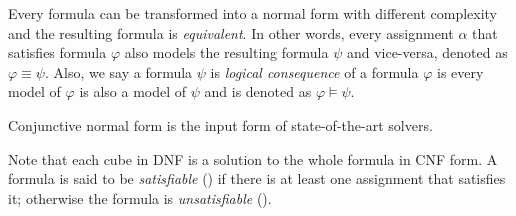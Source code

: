 Every formula can be transformed into a normal form with different complexity and the resulting formula is 
\emph{equivalent}.  
In other words, every assignment $\alpha$ that satisfies formula $\varphi$  also models the resulting formula $\psi$
and vice-versa, denoted as $\varphi \equiv \psi$.
 Also, we say a formula $\psi$ is \emph{logical consequence} of a formula $\varphi$ is every model of $\varphi$
 is also a model of $\psi$ and is denoted as $\varphi \models \psi$.

Conjunctive normal form is the input form of state-of-the-art solvers.
 
Note that each cube in DNF is a solution to the whole formula in CNF form.
A formula is said to be \emph{satisfiable} (\sat) if there is at least one assignment that satisfies it;
otherwise the formula is \emph{unsatisfiable} (\unsat).

%

